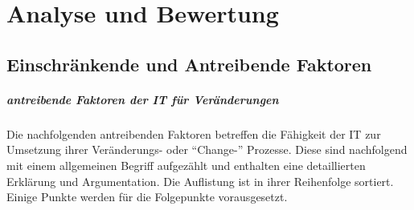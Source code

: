 \chapter{Analyse und Bewertung}
\label{chapter:evaluation}

\section{Einschränkende und Antreibende Faktoren}
\label{section:regulatorik-umgang}

\paragraph{antreibende Faktoren der IT für Veränderungen}
Die nachfolgenden antreibenden Faktoren betreffen die Fähigkeit der IT zur Umsetzung ihrer Veränderungs- oder \enquote{Change-} Prozesse. Diese sind nachfolgend mit einem allgemeinen Begriff aufgezählt und enthalten eine detaillierten Erklärung und Argumentation. Die Auflistung ist in ihrer Reihenfolge sortiert. Einige Punkte werden für die Folgepunkte vorausgesetzt.

